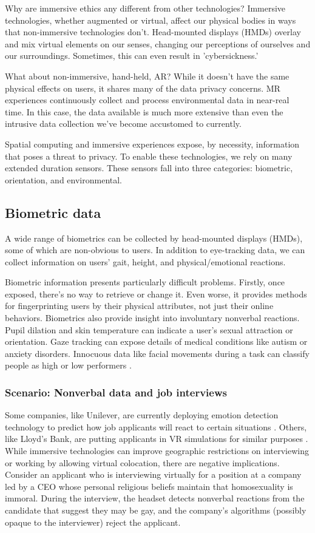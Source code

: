 Why are immersive ethics any different from other technologies? Immersive technologies, whether augmented or virtual, affect our physical bodies in ways that non-immersive technologies don't. Head-mounted displays (HMDs) overlay and mix virtual elements on our senses, changing our perceptions of ourselves and our surroundings. Sometimes, this can even result in 'cybersickness.'

What about non-immersive, hand-held, AR? While it doesn't have the same physical effects on users, it shares many of the data privacy concerns. MR experiences continuously collect and process environmental data in near-real time. In this case, the data available is much more extensive than even the intrusive data collection we've become accustomed to currently.

Spatial computing and immersive experiences expose, by necessity, information that poses a threat to privacy. To enable these technologies, we rely on many extended duration sensors. These sensors fall into three categories: biometric, orientation, and environmental.

\subsection{Biometric data}\label{sec:biometrics}
A wide range of biometrics can be collected by head-mounted displays (HMDs), some of which are non-obvious to users. In addition to eye-tracking data, we can collect information on users' gait, height, and physical/emotional reactions.

Biometric information presents particularly difficult problems. Firstly, once exposed, there's no way to retrieve or change it. Even worse, it provides methods for fingerprinting users by their physical attributes, not just their online behaviors. Biometrics also provide insight into involuntary nonverbal reactions\cite{bailenson2018protecting}. Pupil dilation and skin temperature can indicate a user's sexual attraction or orientation. Gaze tracking can expose details of medical conditions like autism or anxiety disorders. Innocuous data like facial movements during a task can classify people as high or low performers \cite{jabon2011automatically}.

\subsubsection{Scenario: Nonverbal data and job interviews}
Some companies, like Unilever, are currently deploying emotion detection technology to predict how job applicants will react to certain situations \cite{gilliland}. Others, like Lloyd's Bank, are putting applicants in VR simulations for similar purposes \cite{guardian2018how}. While immersive technologies can improve geographic restrictions on interviewing or working by allowing virtual colocation, there are negative implications. Consider an applicant who is interviewing virtually for a position at a company led by a CEO whose personal religious beliefs maintain that homosexuality is immoral. During the interview, the headset detects nonverbal reactions from the candidate that suggest they may be gay, and the company's algorithms (possibly opaque to the interviewer) reject the applicant.

